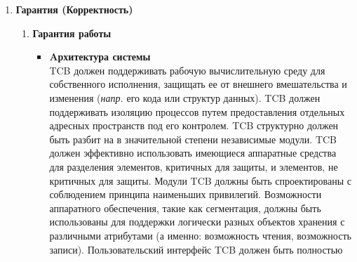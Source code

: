 \begin{enumerate}
\begin{enumerate}
\begin{enumerate}
\begin{enumerate}
				должен быть защищен средствами TCB таким образом, чтобы доступ на чтение был ограничен только уполномоченными на чтение журнала аудита. TCB должен регистрировать следующие события
				в системе: использование механизмов идентификации и аутентификации, передача объектов в пользовательское адресное пространство (\textit{напр.} открытие файла, запуск программы),
				удаление объектов, действия операторов и системных администраторов и/или сотрудников безопасности системы и другие события, связанные с безопасностью. Для каждого зарегистрированного
				события в журнале аудита должно быть указано: время и дата наступления события, пользователь, совершивший действие, тип события, результат события (успех/неудача). Для событий
				идентификации/аутентификации в журнале аудита должно быть указано происхождение запроса (\textit{прим. } кем инициировано событие) (\textit{напр.} идентификатор терминала). Для событий,
				вводящих объект в адресное пространство пользователя и удаляющих объект, запись в журнале аудита должна содержать имя объекта и его уровень конфиденциальности. Администратор
				системы должен иметь возможность выборочного аудита действия любого одного или нескольких пользователей системы на основе индивидуальной идентификации и/или уровне конфиденциальности объекта.
				TCB должен иметь возможность аудита событий для выявления использования скрытых каналов связи.
			\end{enumerate}
			\item{\textbf{Гарантия (Корректность)}}
			\begin{enumerate}
				\item{\textbf{Гарантия работы}}
				\begin{itemize}
					\item{\textbf{Aрхитектура системы}}\\
					TCB должен поддерживать рабочую вычислительную среду для собственного исполнения, защищать ее от внешнего вмешательства и изменения  (\textit{напр.} его кода или структур данных).
					TCB должен поддерживать изоляцию процессов путем предоставления отдельных адресных пространств под его контролем. TCB структурно должен быть разбит на в значительной степени
					независимые модули. TCB должен эффективно использовать имеющиеся аппаратные средства для разделения элементов, критичных для защиты, и элементов, не критичных для защиты.
					Модули TCB должны быть спроектированы с соблюдением принципа наименьших привилегий. Возможности аппаратного обеспечения, такие как сегментация, должны быть использованы
					для поддержки логически разных объектов хранения с различными атрибутами (а именно: возможность чтения, возможность записи). Пользовательский интерфейс TCB должен быть полностью

\end{itemize}
\end{enumerate}
\end{enumerate}
\end{enumerate}
\end{enumerate}
